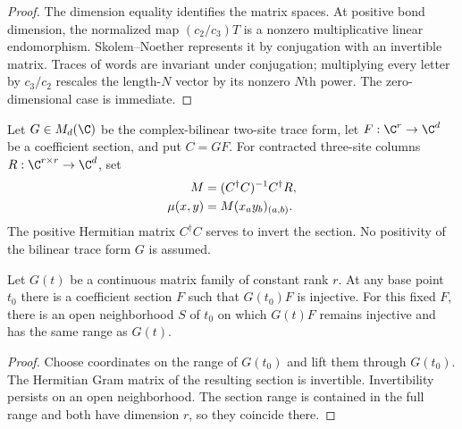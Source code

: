 \begin{proof}\leanok
    The dimension equality identifies the matrix spaces.
    At positive bond dimension, the normalized map $(c_2/c_3)T$ is
    a nonzero multiplicative linear endomorphism. Skolem--Noether represents it by conjugation with an
    invertible matrix. Traces of words are invariant under conjugation;
    multiplying every letter by $c_3/c_2$ rescales the length-$N$ vector
    by its nonzero $N$th power. The zero-dimensional case is immediate.
\end{proof}

\begin{definition}
    \label{def:spt_trace_quotient_product_coordinates}
    \leanok
    Let $G\in M_d(\C)$ be the complex-bilinear two-site trace form,
    let $F:\C^r\to\C^d$ be a coefficient section, and put $C=GF$.
    For contracted three-site columns $R:\C^{r\times r}\to\C^d$, set
    \begin{align}
        M        & =(C^\dagger C)^{-1}C^\dagger R,
        \notag                                     \\
        \mu(x,y) & =M(x_a y_b)_{(a,b)}.
        \notag
    \end{align}
    The positive Hermitian matrix $C^\dagger C$ serves to invert the
    section. No positivity of the bilinear trace form $G$ is assumed.
\end{definition}

\begin{lemma}
    \label{thm:spt_trace_quotient_fixed_section}
    \leanok
    Let $G(t)$ be a continuous matrix family of constant rank $r$.
    At any base point $t_0$ there is a coefficient section $F$ such
    that $G(t_0)F$ is injective. For this fixed $F$, there is an open
    neighborhood $S$ of $t_0$ on which $G(t)F$ remains injective and
    has the same range as $G(t)$.
\end{lemma}

\begin{proof}\leanok
    Choose coordinates on the range of $G(t_0)$ and lift them through
    $G(t_0)$. The Hermitian Gram matrix of the resulting section is
    invertible. Invertibility persists on an open neighborhood.
    The section range is contained in the full range and both have
    dimension $r$, so they coincide there.
\end{proof}



